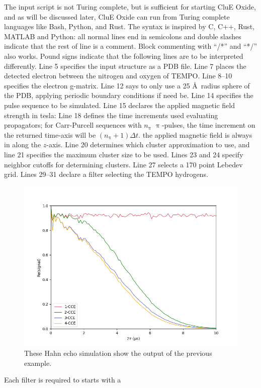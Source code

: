 \documentclass{book}
\begin{document}
The input script is not Turing complete, 
but is sufficient for starting CluE Oxide,
and as will be discussed later, CluE Oxide 
can run from Turing complete languages
like Bash, Python, and Rust.
The syntax is inspired by C, C++, Rust, MATLAB and Python:
all normal lines end in semicolons and double slashes indicate that the rest of 
line is a comment.  Block commenting with ``/*'' and ``*/'' also works. 
Pound signs indicate that the following lines are to be interpreted differently.
Line 5 specifies the input structure as a PDB file.  
Line 7 places the detected electron between the nitrogen and oxygen of TEMPO.
Line 8--10 specifies the electron g-matrix.
Line 12 says to only use a 25 \AA~radius sphere of the PDB, 
applying periodic boundary conditions if need be.
Line 14 specifies the pulse sequence to be simulated.
Line 15 declares the applied magnetic field strength in tesla: 
Line 18 defines the time increments used evaluating propagators; 
for Carr-Purcell sequences with $n_{\uppi}$ $\uppi$-pulses, 
the time increment on the returned time-axis will be $(n_{\uppi}+1)\Delta t$.  
the applied magnetic field is always in along the $z$-axis.
Line 20 determines which cluster approximation to use, 
and line 21 specifies the maximum cluster size to be used.
Lines 23 and 24 specify neighbor cutoffs for determining clusters.
Line 27 selects a 170 point Lebedev grid\cite{1999_Lebedev}.
Lines 29--31 declare a filter selecting the TEMPO hydrogens.
%
\begin{figure} [H]
	\centering
	\includegraphics[width=0.75\linewidth]{figs/fig_CluE-sims_n-CCE.png}
  \caption{These Hahn echo simulation show the output of the previous example.
  }
  \label{fig:example_ncce}
\end{figure}
%
%
Each filter is required to starts with a 
\end{document}
